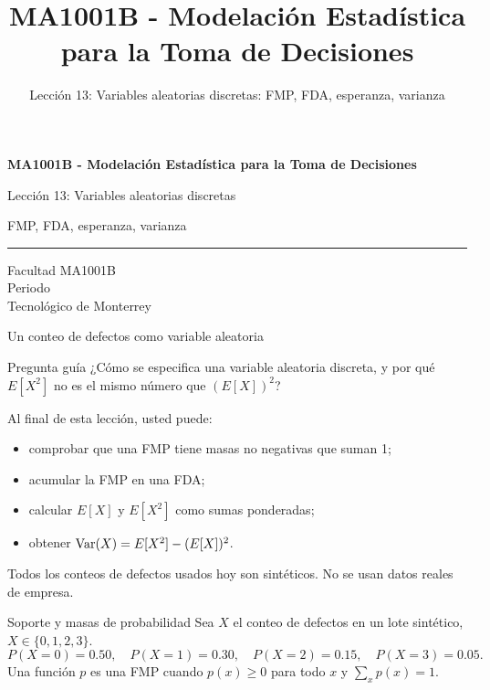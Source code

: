 \documentclass[aspectratio=169,10pt,spanish]{beamer}
\title{MA1001B - Modelación Estadística para la Toma de Decisiones}
\subtitle{Lección 13: Variables aleatorias discretas: FMP, FDA, esperanza, varianza}
\author{}
\institute{Tecnol\'ogico de Monterrey}
\date{}
\begin{document}
\begin{frame}[plain]
  \vspace{0.9cm}
  {\Large\bfseries MA1001B - Modelación Estadística para la Toma de Decisiones\par}
  \vspace{0.55cm}
  {\large Lección 13: Variables aleatorias discretas\par}
  \vspace{0.15cm}
  {\large FMP, FDA, esperanza, varianza\par}
  \vspace{0.55cm}
  {\color{TecRojo}\rule{\textwidth}{1.2pt}}
  \vspace{0.6cm}

  Facultad MA1001B\\[0.3cm]
  Periodo\\[0.3cm]
  Tecnol\'ogico de Monterrey
\end{frame}

\begin{frame}{Un conteo de defectos como variable aleatoria}
  \begin{alertblock}{Pregunta guía}
    ¿Cómo se especifica una variable aleatoria discreta, y por qué $E[X^2]$
    no es el mismo número que $(E[X])^2$?
  \end{alertblock}

  \vspace{0.6em}
  Al final de esta lección, usted puede:
  \begin{itemize}
    \item comprobar que una FMP tiene masas no negativas que suman 1;
    \item acumular la FMP en una FDA;
    \item calcular $E[X]$ y $E[X^2]$ como sumas ponderadas;
    \item obtener $\operatorname{Var}(X)=E[X^2]-(E[X])^2$.
  \end{itemize}

  \vfill
  \scriptsize Todos los conteos de defectos usados hoy son sintéticos. No se usan datos reales de empresa.
\end{frame}

\begin{frame}{Soporte y masas de probabilidad}
  \small
  Sea $X$ el conteo de defectos en un lote sintético, $X\in\{0,1,2,3\}$.
  \[
    P(X=0)=0.50,\quad
    P(X=1)=0.30,\quad
    P(X=2)=0.15,\quad
    P(X=3)=0.05.
  \]
  Una función $p$ es una FMP cuando $p(x)\ge 0$ para todo $x$ y
  $\sum_x p(x)=1$.
\end{frame}
\end{document}
